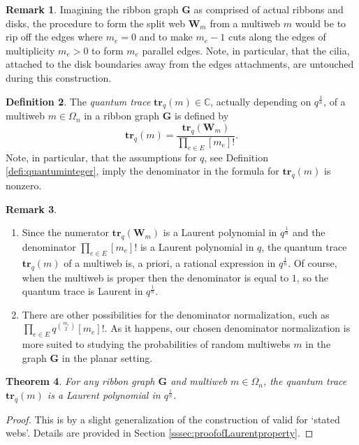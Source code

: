 \documentclass[12pt, reqno]{amsart}
\newtheorem{theo}{Theorem}[section]
\theoremstyle{definition}
\newtheorem{defi}[theo]{Definition}
\newtheorem{rema}[theo]{Remark}
\newcommand{\trq}{\mathbf{tr}_q}%
\begin{document}
\begin{rema}
Imagining the ribbon graph $\mathbf{G}$ as comprised of actual ribbons and disks, the procedure to form the split web $\mathbf{W}_m$ from a multiweb $m$ would be to rip off the edges where $m_e=0$ and to make $m_e-1$ cuts along the edges of multiplicity $m_e>0$ to form $m_e$ parallel edges.  Note, in particular, that the cilia, attached to the disk boundaries away from the edges attachments, are untouched during this construction. 
\end{rema}

\begin{defi}\label{defi:firstquantumtraceofmultiweb}
The \emph{quantum trace} $\trq(m)\in\mathbb{C}$, actually depending on $q^\frac{1}{n}$, of a multiweb $m\in\Omega_n$ in a ribbon graph $\mathbf{G}$ is defined by
$$
\trq(m)=\frac{\trq(\mathbf{W}_m)}{\prod_{e\in E}[m_e]!}.
$$
Note, in particular, that the assumptions for $q$, see Definition \ref{defi:quantuminteger}, imply the denominator in the formula for $\trq(m)$ is nonzero.
\end{defi}

\begin{rema}\label{rema:afterdefof3dquantumtrace}
\begin{enumerate}
\item
Since the numerator $\trq(\mathbf{W}_m)$ is a Laurent polynomial in $q^\frac{1}{n}$ and the denominator $\prod_{e\in E}[m_e]!$ is a Laurent polynomial in $q$, the quantum trace $\trq(m)$ of a multiweb is, a priori, a rational expression in $q^\frac{1}{n}$.  Of course, when the multiweb is proper then the denominator is equal to $1$, so the quantum trace is Laurent in $q^\frac{1}{n}$.  
\item\label{item:rema:afterdefof3dquantumtrace}
There are other possibilities for the denominator normalization, such as $\prod_{e\in E}q^{\binom{m_e}{2}}[m_e]!$.  As it happens, our chosen denominator normalization is more suited to studying the probabilities of random multiwebs $m$ in the graph $\mathbf{G}$ in the planar setting.  
\end{enumerate}
\end{rema}

\begin{theo}\label{theo:polynomial}
For any ribbon graph $\mathbf{G}$ and multiweb $m\in\Omega_n$, the quantum trace $\trq(m)$ is a Laurent polynomial in $q^\frac{1}{n}$.
\end{theo}

\begin{proof}
This is by a slight generalization of the construction of \cite{sikora1} valid for `stated webs'.  Details are provided in Section \ref{sssec:proofofLaurentproperty}.  
\end{proof}
\end{document}
